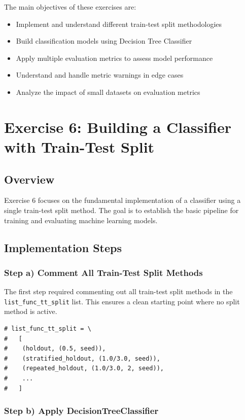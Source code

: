 \documentclass[12pt,a4paper]{article}
\begin{document}
The main objectives of these exercises are:
\begin{itemize}
    \item Implement and understand different train-test split methodologies
    \item Build classification models using Decision Tree Classifier
    \item Apply multiple evaluation metrics to assess model performance
    \item Understand and handle metric warnings in edge cases
    \item Analyze the impact of small datasets on evaluation metrics
\end{itemize}

\section{Exercise 6: Building a Classifier with Train-Test Split}

\subsection{Overview}

Exercise 6 focuses on the fundamental implementation of a classifier using a single train-test split method. The goal is to establish the basic pipeline for training and evaluating machine learning models.

\subsection{Implementation Steps}

\subsubsection{Step a) Comment All Train-Test Split Methods}

The first step required commenting out all train-test split methods in the \texttt{list\_func\_tt\_split} list. This ensures a clean starting point where no split method is active.

\begin{lstlisting}[caption={Commented split methods}]
# list_func_tt_split = \
#   [
#    (holdout, (0.5, seed)),
#    (stratified_holdout, (1.0/3.0, seed)),
#    (repeated_holdout, (1.0/3.0, 2, seed)),
#    ...
#   ]
\end{lstlisting}

\subsubsection{Step b) Apply DecisionTreeClassifier}
\end{document}
